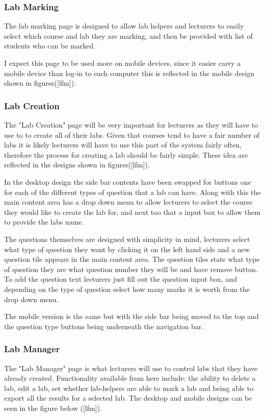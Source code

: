 \documentclass[12pt]{article}  %
\begin{document}
\subsubsection{Lab Marking}
The lab marking page is designed to allow lab helpers and lecturers to easily select which course and lab they are marking, and then be provided with list of students who can be marked.

I expect this page to be used more on mobile devices, since it easier carry a mobile device than log-in to each computer this is reflected in the mobile design shown in figures([lfm]).


\subsubsection{Lab Creation}
The "Lab Creation" page will be very important for lecturers as they will have to use to to create all of their labs. Given that courses tend to have a fair number of labs it is likely lecturers will have to use this part of the system fairly often, therefore the process for creating a lab should be fairly simple. These idea are reflected in the designs shown in figures([lfm]).


\noindent In the desktop design the side bar contents have been swapped for buttons one for each of the different types of question that a lab can have. Along with this the main content area has a drop down menu to allow lecturers to select the course they would like to create the lab for, and next too that a input box to allow them to provide the labs name.

The questions themselves are designed with simplicity in mind, lecturers select what type of question they want by clicking it on the left hand side and a new question tile appears in the main content area. The question tiles state what type of question they are what question number they will be and have remove button. To add the question text lecturers just fill out the question input box, and depending on the type of question select how many marks it is worth from the drop down menu. 

The mobile version is the same but with the side bar being moved to the top and the question type buttons being underneath the navigation bar.



\subsubsection{Lab Manager}
The "Lab Manager" page is what lecturers will use to control labs that they have already created. Functionality available from here include: the ability to delete a lab, edit a lab, set whether lab-helpers are able to mark a lab and being able to export all the results for a selected lab. The desktop and mobile designs can be seen in the figure below ([lfm]). 
\end{document}
